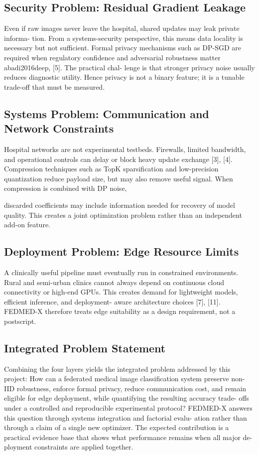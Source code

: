\documentclass[12pt,a4paper]{report}
\begin{document}
\subsection{Security Problem: Residual Gradient Leakage}
Even if raw images never leave the hospital, shared updates may leak private informa- tion. From a systems-security perspective, this means data locality is necessary but not sufficient. Formal privacy mechanisms such as DP-SGD are required when regulatory confidence and adversarial robustness matter abadi2016deep, [5]. The practical chal- lenge is that stronger privacy noise usually reduces diagnostic utility. Hence privacy is not a binary feature; it is a tunable trade-off that must be measured.
\subsection{Systems Problem: Communication and Network Constraints}
Hospital networks are not experimental testbeds. Firewalls, limited bandwidth, and operational controls can delay or block heavy update exchange [3], [4]. Compression techniques such as TopK sparsification and low-precision quantization reduce payload size, but may also remove useful signal. When compression is combined with DP noise,

discarded coefficients may include information needed for recovery of model quality.
This creates a joint optimization problem rather than an independent add-on feature.
\subsection{Deployment Problem: Edge Resource Limits}
A clinically useful pipeline must eventually run in constrained environments. Rural and semi-urban clinics cannot always depend on continuous cloud connectivity or high-end
GPUs. This creates demand for lightweight models, efficient inference, and deployment- aware architecture choices [7], [11]. FEDMED-X therefore treats edge suitability as a design requirement, not a postscript.
\subsection{Integrated Problem Statement}
Combining the four layers yields the integrated problem addressed by this project:
How can a federated medical image classification system preserve non-IID robustness, enforce formal privacy, reduce communication cost, and remain eligible for edge deployment, while quantifying the resulting accuracy trade- offs under a controlled and reproducible experimental protocol?
FEDMED-X answers this question through systems integration and factorial evalu- ation rather than through a claim of a single new optimizer. The expected contribution is a practical evidence base that shows what performance remains when all major de- ployment constraints are applied together.
\end{document}
